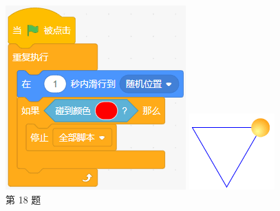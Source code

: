 \documentclass[10pt, a4paper]{article}
\begin{document}
\begin{enumerate}
\begin{figure}[htbp]
\begin{minipage}[t]{.4\textwidth}
\begin{minipage}[t]{.5\textwidth}
                \end{minipage}
                \begin{minipage}[t]{.4\textwidth}
                    \centering
                    \includegraphics[width=\textwidth]{figure/18-2.png}
                \end{minipage}
                \caption*{第 18 题}
            \end{minipage}
            \begin{minipage}[t]{.1\textwidth}
                \centering
                \includegraphics[width=\textwidth]{figure/19.png}

\end{minipage}
\end{figure}
\end{enumerate}
\end{document}
